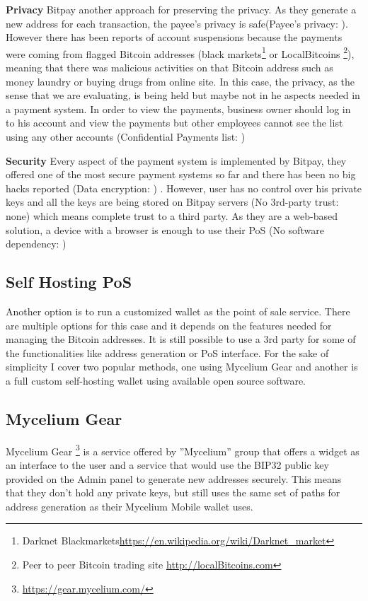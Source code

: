  \textbf{Privacy}
Bitpay another approach for preserving the privacy. As they generate a new address for each transaction, the payee's privacy is safe(Payee's privacy: \full). However there has been reports of account suspensions because the payments were coming from flagged Bitcoin addresses (\eg black markets\footnote{Darknet Blackmarkets\url{https://en.wikipedia.org/wiki/Darknet_market}} or LocalBitcoins \footnote{Peer to peer Bitcoin trading site \url{http://localBitcoins.com}}), meaning that there was malicious activities on that Bitcoin address such as money laundry or buying drugs from online site. In this case, the privacy, as the sense that we are evaluating, is being held but maybe not in he aspects needed in a payment system. In order to view the payments, business owner should log in to his account and view the payments but other employees cannot see the list using any other accounts (Confidential Payments list: \prt)

 \textbf{Security}
Every aspect of the payment system is implemented by Bitpay, they offered one of the most secure payment systems so far and there has been no big hacks reported (Data encryption: \prt) . However, user has no control over his private keys and all the keys are being stored on Bitpay servers (No 3rd-party trust: none) which means complete trust to a third party. As they are a web-based solution, a device with a browser is enough to use their PoS (No software dependency: \full)


\subsection{Self Hosting PoS}
Another option is to run a customized wallet as the point of sale service. There are multiple options for this case and it depends on the features needed for managing the Bitcoin addresses. It is still possible to use a 3rd party for some of the functionalities like address generation or PoS interface. For the sake of simplicity I cover two popular methods, one using Mycelium Gear and another is a full custom self-hosting wallet using available open source software.


\subsection{Mycelium Gear}
Mycelium Gear \footnote{\url{https://gear.mycelium.com/}} is a service offered by ''Mycelium'' group that offers a widget as an interface to the user and a service that would use the BIP32 public key provided on the Admin panel to generate new addresses securely. This means that they don't hold any private keys, but still uses the same set of paths for address generation as their Mycelium Mobile wallet uses.

